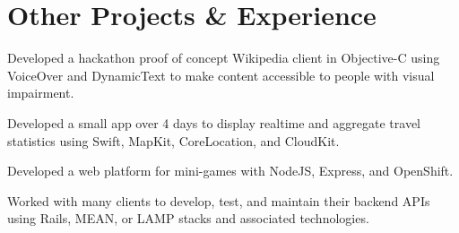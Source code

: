 \documentclass[]{jhearn-resume}
\begin{document}
\begin{minipage}[t]{0.64\textwidth} 
\vspace{-11pt}
\noindent\makebox[\linewidth]{\rule{1000pt}{0.4pt}}
\vspace{-5pt}

\section{Other Projects \& Experience}

\begin{tightemize}
\item Developed a hackathon proof of concept Wikipedia client in Objective-C using VoiceOver and DynamicText to make content accessible to people with visual impairment.
\end{tightemize}
\sectionsep

\begin{tightemize}
\item Developed a small app over 4 days to display realtime and aggregate travel statistics using Swift, MapKit, CoreLocation, and CloudKit.
\end{tightemize}
\sectionsep

\begin{tightemize}
\item Developed a web platform for mini-games with NodeJS, Express, and OpenShift.
\end{tightemize}
\sectionsep

\begin{tightemize}
\item Worked with many clients to develop, test, and maintain their backend APIs using Rails, MEAN, or LAMP stacks and associated technologies.
\end{tightemize}
\sectionsep


\end{minipage}
\end{document}
